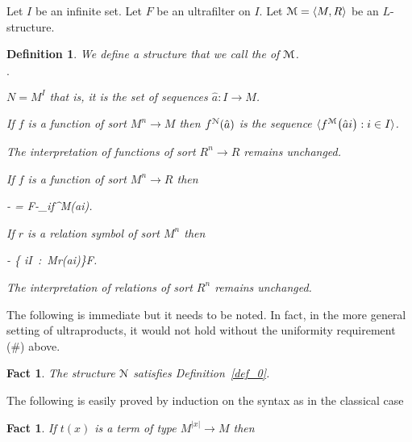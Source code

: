 \documentclass[12pt,letterpaper,oneside,reqno]{amsart}
\newcommand{\mylabel}[1]{{#1}\hfill}
\renewenvironment{itemize}
  {\begin{list}{$\cdot$}{%
   \setlength{\parskip}{0mm}
   \setlength{\topsep}{.2\baselineskip}
   \setlength{\rightmargin}{0mm}
   \setlength{\listparindent}{0mm}
   \setlength{\itemindent}{0mm}
   \setlength{\labelwidth}{3ex}
   \setlength{\itemsep}{.2\baselineskip}
   \setlength{\parsep}{.2\baselineskip}
   \setlength{\partopsep}{0mm}
   \setlength{\labelsep}{1ex}
   \setlength{\leftmargin}{\labelwidth+\labelsep}
   \let\makelabel\mylabel}}{%
   \end{list}}
\theoremstyle{plain}
\newtheorem{fact}[theorem]{Fact}
\newtheorem{definition}[theorem]{Definition}
\theoremstyle{remark}
\renewcommand*{\emph}[1]{%
   \smash{\tikz[baseline]\node[rectangle, fill=olive!25, rounded corners, inner xsep=0.5ex, inner ysep=0.2ex, anchor=base, minimum height = 2.7ex]{#1};}}
\begin{document}
Let $I$ be an infinite set.
Let $F$ be an ultrafilter on $I$.
Let ${\EuScript M}=\langle  M,R\rangle$ be an $L$-structure.

\begin{definition}\label{def_ultraproduct}
  We define a structure \emph{${\EuScript N}=\langle  N,R\rangle$\/} that we call the \emph{ultrapower\/} of ${\EuScript M}$.
  \begin{itemize}
    \item[1.] $N=M^I$ that is, it is the set of sequences $\hat a: I\to M$.
    \item[2.] If $f$ is a function of sort $ M^n\to  M$ then $f^{\EuScript N}(\hat a)$ is the sequence 
    $\langle f^{\EuScript M}\big(\hat ai\big):i\in I\rangle$.
    \item[3.] The interpretation of functions of sort $R^n\to  R$ remains unchanged.
    \item[4.] If $f$ is a function of sort $ M^n\to R$ then 
    
    \noindent\kern-\leftmargin
    {=}
    {F\mbox{-}\lim_if^{\EuScript M}\big(\hat ai\big).}
    
    \item[5.] If $r$ is a relation symbol of sort $M^n$ then 
    
    \noindent\kern-\leftmargin
    {\Leftrightarrow}
    {\big\{ i\in I\ :\ {\EuScript M}\models r(\hat ai)\big\}\in F.}
    
    \item[6.] The interpretation of relations of sort $R^n$ remains unchanged.
  \end{itemize}
\end{definition}

The following is immediate but it needs to be noted.
In fact, in the more general setting of ultraproducts, it would not hold without the uniformity requirement (\#) above.

\begin{fact}\label{fact_termini1}
  The structure ${\EuScript N}$ satisfies Definition~\ref{def_0}.
\end{fact}

The following is easily proved by induction on the syntax as in the classical case

\begin{fact}\label{fact_easy_induz}
  If  $t(x)$ is a term of type $M^{|x|}\to M$ then
  
  \hfill\qedsymbol
\end{fact}
\end{document}
